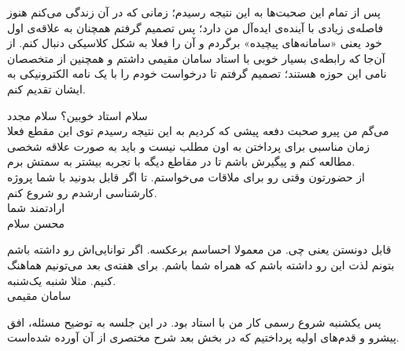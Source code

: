 پس از تمام این صحبت‌ها به این نتیجه رسیدم؛ زمانی که در آن زندگی می‌کنم هنوز فاصله‌ی زیادی با آینده‌ی ایده‌آل من دارد؛ پس تصمیم گرفتم همچنان به علاقه‌ی اول خود یعنی «سامانه‌های پیچیده» برگردم و آن را فعلا به شکل کلاسیکی دنبال کنم. از آن‌جا که رابطه‌ی بسیار خوبی با استاد سامان مقیمی داشتم و همچنین از متخصصان نامی این حوزه هستند؛ تصمیم گرفتم تا درخواست خودم را با یک نامه الکترونیکی به ایشان تقدیم کنم.
\begin{mohsenletter}

	سلام استاد خوبین؟ سلام مجدد\\
	می‌گم من پیرو صحبت دفعه پیشی که کردیم به این نتیجه رسیدم توی این مقطع فعلا زمان مناسبی برای پرداختن به اون مطلب نیست و باید به صورت علاقه شخصی مطالعه کنم و پیگیرش باشم تا در مقاطع دیگه با تجربه بیشتر به سمتش برم.\\
	
	از حضورتون وقتی رو برای ملاقات می‌خواستم. تا اگر قابل بدونید با شما پروژه کارشناسی ارشدم رو شروع کنم.\\
	
	ارادتمند شما\\
	محسن
	\medskip
	سلام
	
	قابل دونستن یعنی چی. من معمولا احساسم برعکسه. اگر توانایی‌اش رو داشته باشم بتونم لذت این رو داشته باشم که همراه شما باشم.
	برای هفته‌ی بعد می‌تونیم هماهنگ کنیم. مثلا شنبه یک‌شنبه.\\
	
	سامان مقیمی
\end{mohsenletter}
پس یکشنبه شروع رسمی کار من با استاد بود. در این جلسه به توضیح مسئله، افق پیشرو و قدم‌های اولیه پرداختیم که در بخش بعد شرح مختصری از آن آورده شده‌است.

